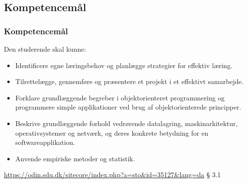 \documentclass[t, aspectratio=169]{beamer}
\begin{document}
\subsection{Kompetencemål}
\begin{frame}[fragile]
  \frametitle{Kompetencemål}
  \vspace{3mm}
  Den studerende skal kunne:
  \begin{itemize}
    \item Identificere egne læringsbehov og planlægge strategier for effektiv læring.
    \item Tilrettelægge, gennemføre og præsentere et projekt i et effektivt samarbejde.
    \item Forklare grundlæggende begreber i objektorienteret programmering og programmere simple applikationer ved brug af objektorienterede principper.
    \item Beskrive grundlæggende forhold vedrørende datalagring, maskinarkitektur, operativsystemer og netværk, og deres konkrete betydning for en softwareapplikation.
    \item Anvende empiriske metoder og statistik.
  \end{itemize}
  
  \vspace{5mm}
  \textcolor{blue}{\url{https://odin.sdu.dk/sitecore/index.php?a=sto&id=35127&lang=da}} § 3.1
\end{frame}
\end{document}
